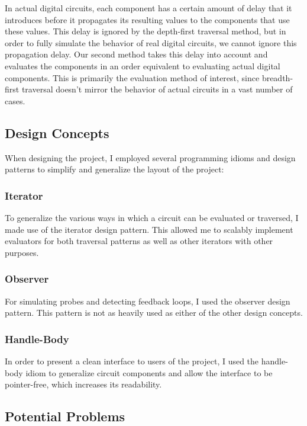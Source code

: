 \documentclass{article}
\begin{document}
In actual digital circuits, each component has a certain amount of delay that it introduces before it propagates its resulting values to the components that use these values. This delay is ignored by the depth-first traversal method, but in order to fully simulate the behavior of real digital circuits, we cannot ignore this propagation delay. Our second method takes this delay into account and evaluates the components in an order equivalent to evaluating actual digital components. This is primarily the evaluation method of interest, since breadth-first traversal doesn’t mirror the behavior of actual circuits in a vast number of cases.

\subsection{Design Concepts}

When designing the project, I employed several programming idioms and design patterns to simplify and generalize the layout of the project:

\subsubsection{Iterator}

To generalize the various ways in which a circuit can be evaluated or traversed, I made use of the iterator design pattern. This allowed me to scalably implement evaluators for both traversal patterns as well as other iterators with other purposes.

\subsubsection{Observer}

For simulating probes and detecting feedback loops, I used the observer design pattern. This pattern is not as heavily used as either of the other design concepts.

\subsubsection{Handle-Body}

In order to present a clean interface to users of the project, I used the handle-body idiom to generalize circuit components and allow the interface to be pointer-free, which increases its readability.

\subsection{Potential Problems}
\end{document}
